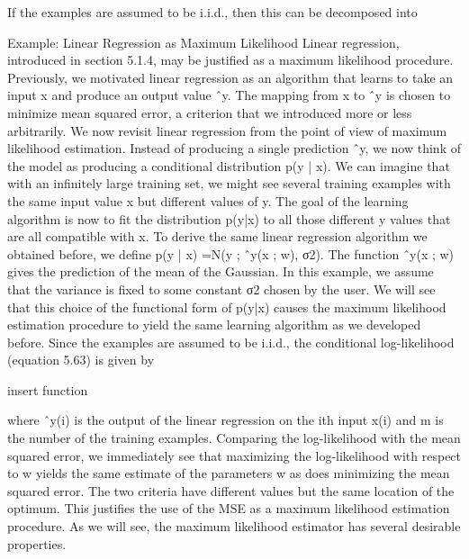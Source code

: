 \documentclass[11pt]{article}
\begin{document}
If the examples are assumed to be i.i.d., then this can be decomposed into

Example: Linear Regression as Maximum Likelihood
Linear regression,
introduced in section 5.1.4, may be justiﬁed as a maximum likelihood procedure.
Previously, we motivated linear regression as an algorithm that learns to take an input x and produce an output value ˆy.
The mapping from x to ˆy is chosen to minimize mean squared error, a criterion that we introduced more or less arbitrarily.
We now revisit linear regression from the point of view of maximum likelihood estimation.
Instead of producing a single prediction ˆy, we now think of the model as producing a conditional distribution p(y | x).
We can imagine that with an inﬁnitely large training set, we might see several training examples with the same input value x but diﬀerent values of y.
The goal of the learning algorithm is now to ﬁt the distribution p(y|x) to all those diﬀerent y values that are all compatible with x.
To derive the same linear regression algorithm we obtained before, we deﬁne p(y | x) =N(y ; ˆy(x ; w), σ2).
The function ˆy(x ; w) gives the prediction of the mean of the Gaussian.
In this example, we assume that the variance is ﬁxed to some constant σ2 chosen by the user.
We will see that this choice of the functional form of p(y|x) causes the maximum likelihood estimation procedure to yield the
same learning algorithm as we developed before.
Since the examples are assumed to be i.i.d., the conditional log-likelihood (equation 5.63) is given by

    insert function

where ˆy(i) is the output of the linear regression on the ith input x(i) and m is the number of the training examples.
Comparing the log-likelihood with the mean squared error, we immediately see that maximizing the log-likelihood with respect to w yields the same estimate of the parameters w as does minimizing the mean squared error.
The two criteria have diﬀerent values but the same location of the optimum.
This justiﬁes the use of the MSE as a maximum likelihood estimation procedure.
As we will see, the maximum likelihood estimator has several desirable properties.
\end{document}
